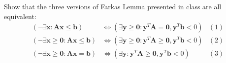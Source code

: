 



    \maketitle

    \begin{thm}{}{}
        Show that the three versions of Farkas Lemma presented in class are all equivalent:
        \begin{align*}
        (\neg \exists \mathbf{x}: \mathbf{A}\mathbf{x}\le \mathbf{b}) &\iff (\exists \mathbf{y}\ge \mathbf{0} :\mathbf{y}^{T}\mathbf{A}=\mathbf{0},\mathbf{y}^{T}\mathbf{b}<0) &(1)\\
        (\neg \exists \mathbf{x}\ge \mathbf{0}: \mathbf{A}\mathbf{x}\le \mathbf{b}) &\iff (\exists \mathbf{y}\ge \mathbf{0} :\mathbf{y}^{T}\mathbf{A}\ge \mathbf{0},\mathbf{y}^{T}\mathbf{b}<0) &(2)\\
        (\neg \exists \mathbf{x}\ge \mathbf{0}: \mathbf{A}\mathbf{x}= \mathbf{b}) &\iff (\exists \mathbf{y} :\mathbf{y}^{T}\mathbf{A}\ge \mathbf{0},\mathbf{y}^{T}\mathbf{b}<0)&(3)
        \end{align*}
    \end{thm}
